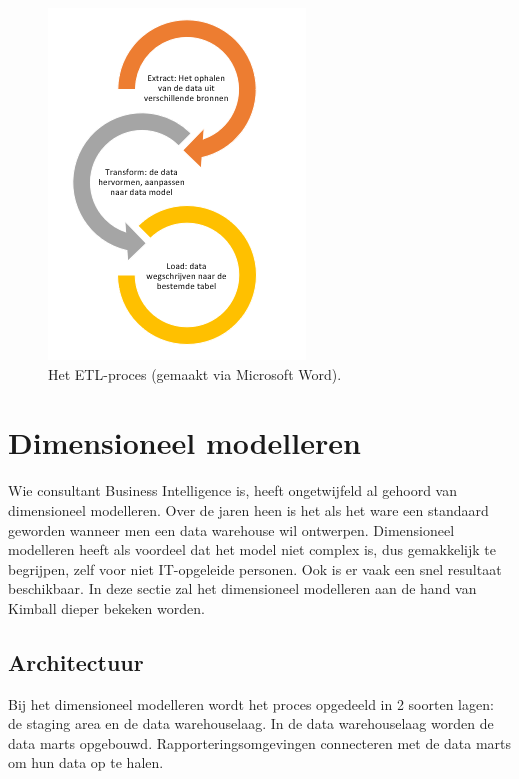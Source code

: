 \begin{figure}[h]
	\centering
	\includegraphics[scale=1]{../images/ETL.PNG}
	\caption{Het ETL-proces (gemaakt via Microsoft Word).}
	\label{fig:etl}
\end{figure}

\pagebreak

\section{Dimensioneel modelleren}
Wie consultant Business Intelligence is, heeft ongetwijfeld al gehoord van dimensioneel modelleren. Over de jaren heen is het als het ware een standaard geworden wanneer men een data warehouse wil ontwerpen. Dimensioneel modelleren heeft als voordeel dat het model niet complex is, dus gemakkelijk te begrijpen, zelf voor niet IT-opgeleide personen. Ook is er vaak een snel resultaat beschikbaar. In deze sectie zal het dimensioneel modelleren aan de hand van Kimball dieper bekeken worden. 


\subsection{Architectuur}
Bij het dimensioneel modelleren wordt het proces opgedeeld in 2 soorten lagen: de staging area en de data warehouselaag. In de data warehouselaag worden de data marts opgebouwd. Rapporteringsomgevingen connecteren met de data marts om hun data op te halen.

